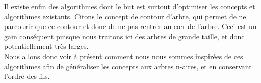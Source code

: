 Il existe enfin des algorithmes dont le but est surtout d'optimiser les concepts et algorithmes existants. Citons le concept de contour d'arbre, qui permet de ne parcourir que ce contour et donc de ne pas rentrer au c\oe{}r de l'arbre. Ceci est un gain conséquent puisque nous traitons ici des arbres de grande taille, et donc potentiellement très larges.
~\\
Nous allons donc voir à présent comment nous nous sommes inspirées de ces algorithmes afin de généraliser les concepts aux arbres n-aires, et en conservant l'ordre des fils.